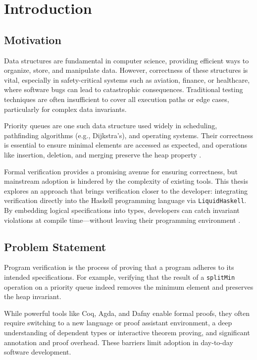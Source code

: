 \chapter{Introduction} %

\section{ Motivation }
Data structures are fundamental in computer science, providing efficient ways to organize, store, and manipulate data.
However, correctness of these structures is vital, especially in safety-critical systems such as aviation, finance, or healthcare, where software bugs can lead to catastrophic consequences.
Traditional testing techniques are often insufficient to cover all execution paths or edge cases, particularly for complex data invariants.

Priority queues are one such data structure used widely in scheduling, pathfinding algorithms (e.g., Dijkstra’s), and operating systems.
Their correctness is essential to ensure minimal elements are accessed as expected, and operations like insertion, deletion, and merging preserve the heap property \cite{okasaki}.

Formal verification provides a promising avenue for ensuring correctness, but mainstream adoption is hindered by the complexity of existing tools.
This thesis explores an approach that brings verification closer to the developer:
integrating verification directly into the Haskell programming language via \texttt{LiquidHaskell}.
By embedding logical specifications into types, developers can catch invariant violations at compile time—without leaving their programming environment \cite{rondonLiquidTypes2008}.

\section{ Problem Statement }
Program verification is the process of proving that a program adheres to its intended specifications. 
For example, verifying that the result of a \texttt{splitMin} operation on a priority queue indeed removes the minimum element and preserves the heap invariant.

While powerful tools like Coq, Agda, and Dafny enable formal proofs,
they often require switching to a new language or proof assistant environment,
a deep understanding of dependent types or interactive theorem proving, and significant annotation and proof overhead.
These barriers limit adoption in day-to-day software development.


